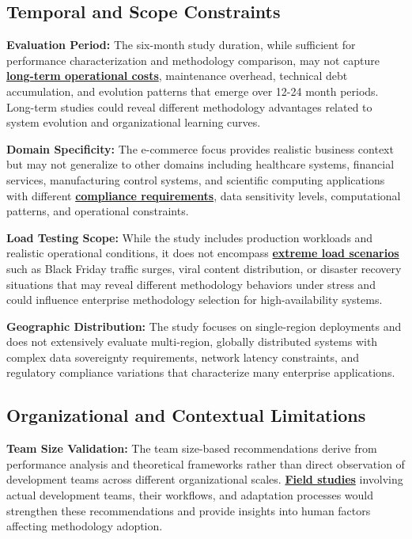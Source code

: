 \subsection{Temporal and Scope Constraints}
\label{subsec:temporal_constraints}

\textbf{Evaluation Period:} The six-month study duration, while sufficient for performance characterization and methodology comparison, may not capture \textbf{\hyperref[longitudinal_studies]{long-term operational costs}}, maintenance overhead, technical debt accumulation, and evolution patterns that emerge over 12-24 month periods. Long-term studies could reveal different methodology advantages related to system evolution and organizational learning curves.

\textbf{Domain Specificity:} The e-commerce focus provides realistic business context but may not generalize to other domains including healthcare systems, financial services, manufacturing control systems, and scientific computing applications with different \textbf{\hyperref[compliance_frameworks]{compliance requirements}}, data sensitivity levels, computational patterns, and operational constraints.

\textbf{Load Testing Scope:} While the study includes production workloads and realistic operational conditions, it does not encompass \textbf{\hyperref[extreme_load_scenarios]{extreme load scenarios}} such as Black Friday traffic surges, viral content distribution, or disaster recovery situations that may reveal different methodology behaviors under stress and could influence enterprise methodology selection for high-availability systems.

\textbf{Geographic Distribution:} The study focuses on single-region deployments and does not extensively evaluate multi-region, globally distributed systems with complex data sovereignty requirements, network latency constraints, and regulatory compliance variations that characterize many enterprise applications.

\subsection{Organizational and Contextual Limitations}
\label{subsec:organizational_limitations}

\textbf{Team Size Validation:} The team size-based recommendations derive from performance analysis and theoretical frameworks rather than direct observation of development teams across different organizational scales. \textbf{\hyperref[organizational_case_studies]{Field studies}} involving actual development teams, their workflows, and adaptation processes would strengthen these recommendations and provide insights into human factors affecting methodology adoption.

